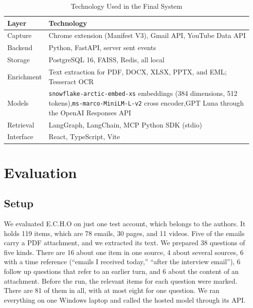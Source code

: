 \documentclass[conference]{IEEEtran}
\newcommand{\embmodel}{\texttt{snowflake\allowbreak-arctic\allowbreak-embed\allowbreak-xs}}
\newcommand{\embdim}{384}
\newcommand{\rerankmodel}{\texttt{ms\allowbreak-marco\allowbreak-MiniLM\allowbreak-L\allowbreak-6\allowbreak-v2}}
\newcommand{\llmname}{GPT\nobreakdash-6 Luna}
\begin{document}
\begin{table}[t]
\caption{Technology Used in the Final System}
\label{tab:stack}
\centering
\renewcommand{\arraystretch}{1.05}
\begin{tabular}{|>{\raggedright\arraybackslash}p{1.6cm}|>{\raggedright\arraybackslash}p{5.95cm}|}
\hline
\textbf{Layer} & \textbf{Technology} \\
\hline
Capture & Chrome extension (Manifest V3), Gmail API, YouTube Data API \\
\hline
Backend & Python, FastAPI, server sent events \\
\hline
Storage & PostgreSQL 16, FAISS, Redis, all local \\
\hline
Enrichment & Text extraction for PDF, DOCX, XLSX, PPTX, and EML; Tesseract OCR \\
\hline
Models & \embmodel{} embeddings (\embdim{} dimensions, 512 tokens),\newline \rerankmodel{} cross encoder,\newline \llmname{} through the OpenAI Responses API \\
\hline
Retrieval & LangGraph, LangChain, MCP Python SDK (stdio) \\
\hline
Interface & React, TypeScript, Vite \\
\hline
\end{tabular}
\end{table}

\section{Evaluation}\label{sec:eval}
\subsection{Setup}
We evaluated E.C.H.O on just one test account, which belongs to the authors. It holds 119 items, which are 78 emails, 30 pages, and 11 videos. Five of the emails carry a PDF attachment, and we extracted its text. We prepared 38 questions of five kinds. There are 16 about one item in one source, 4 about several sources, 6 with a time reference (``emails I received today,'' ``after the interview email''), 6 follow up questions that refer to an earlier turn, and 6 about the content of an attachment. Before the run, the relevant items for each question were marked. There are 81 of them in all, with at most eight for one question. We ran everything on one Windows laptop and called the hosted model through its API.
\end{document}
